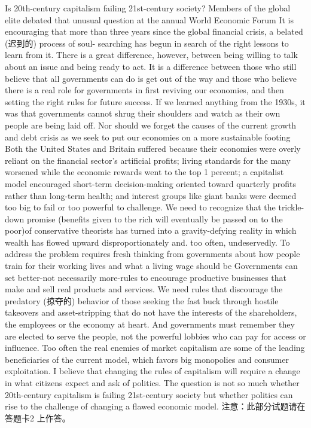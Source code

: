 \documentclass[UTF8,11pt]{ctexart}
\begin{document}
Is 20th-century capitalism failing 21st-century society? Members of the global elite debated that unusual question at the annual World Economic Forum It is encouraging that more than three years since the global financial crisis, a belated (迟到的) process of soul- searching has begun in search of the right lessons to learn from it. There is a great difference, however, between being willing to talk about an issue and being ready to act. It is a difference between those who still believe that all governments can do is get out of the way and those who believe there is a real role for governments in first reviving our economies, and then setting the right rules for future success. If we learned anything from the 1930s, it was that governments cannot shrug their shoulders and watch as their own people are being laid off. Nor should we forget the causes of the current growth and debt crisis as we seek to put our economies on a more sustainable footing Both the United States and Britain suffered because their economies were overly reliant on the financial sector's artificial profits; living standards for the many worsened while the economic rewards went to the top 1 percent; a capitalist model encouraged short-term decision-making oriented toward quarterly profits rather than long-term health; and interest groups like giant banks were deemed too big to fail or too powerful to challenge. We need to recognize that the trickle-down promise (benefits given to the rich will eventually be passed on to the poor)of conservative theorists has turned into a gravity-defying reality in which wealth has flowed upward disproportionately and. too often, undeservedly. To address the problem requires fresh thinking from governments about how people train for their working lives and what a living wage should be Governments can set better-not necessarily more-rules to encourage productive businesses that make and sell real products and services. We need rules that discourage the predatory (掠夺的) behavior of those seeking the fast buck through hostile takeovers and asset-stripping that do not have the interests of the shareholders, the employees or the economy at heart. And governments must remember they are elected to serve the people, not the powerful lobbies who can pay for access or influence. Too often the real enemies of market capitalism are some of the leading beneficiaries of the current model, which favors big monopolies and consumer exploitation. I believe that changing the rules of capitalism will require a change in what citizens expect and ask of politics. The question is not so much whether 20th-century capitalism is failing 21st-century society but whether politics can rise to the challenge of changing a flawed economic model. 注意：此部分试题请在答题卡2 上作答。
\end{document}
